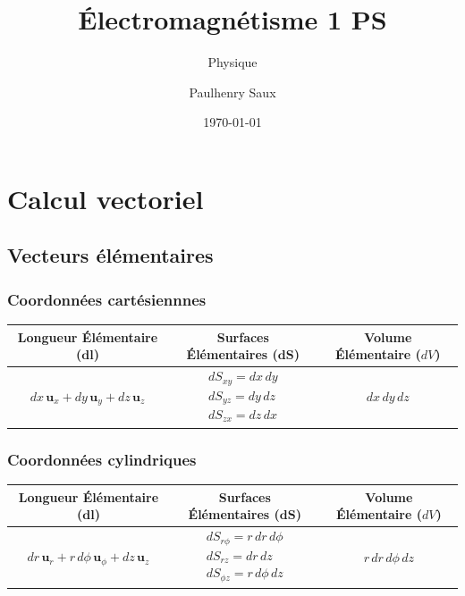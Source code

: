 \documentclass[french]{yLectureNote}
\title{Électromagnétisme 1 PS}
\subtitle{Physique}
\author{Paulhenry Saux}
\date{\today}
\begin{document}
\setcounter{chapter}{-1}
\chapter{Calcul vectoriel}
\section{Vecteurs élémentaires}
\subsection{Coordonnées cartésiennnes}
    \renewcommand{\arraystretch}{1.5} %
    \begin{tabular}{|c|c|c|}
        \hline
        \textbf{Longueur Élémentaire} ($\mathbf{dl}$) & \textbf{Surfaces Élémentaires} ($\mathbf{dS}$) & \textbf{Volume Élémentaire} ($dV$) \\
        \hline
         $dx\, \mathbf{u}_x + dy\, \mathbf{u}_y + dz\, \mathbf{u}_z$ & $\begin{array}{l} dS_{xy} = dx\, dy \\ dS_{yz} = dy\, dz \\ dS_{zx} = dz\, dx \end{array}$ & $dx\, dy\, dz$ \\
        \hline
    \end{tabular}
\subsection{Coordonnées cylindriques}
\begin{tabular}{|c|c|c|}
        \hline
         \textbf{Longueur Élémentaire} ($\mathbf{dl}$) & \textbf{Surfaces Élémentaires} ($\mathbf{dS}$) & \textbf{Volume Élémentaire} ($dV$) \\
        \hline
         $dr\, \mathbf{u}_r + r\, d\phi\, \mathbf{u}_{\phi} + dz\, \mathbf{u}_z$ & $\begin{array}{l} dS_{r\phi} = r\, dr\, d\phi \\ dS_{r z} = dr\, dz \\ dS_{\phi z} = r\, d\phi\, dz \end{array}$ & $r\, dr\, d\phi\, dz$ \\
        \hline
    \end{tabular}
\end{document}
